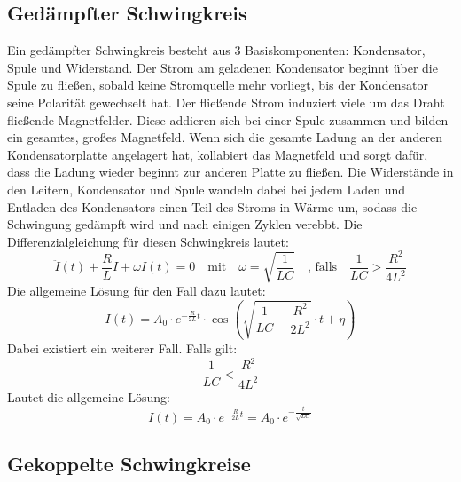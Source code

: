 \subsection{Gedämpfter Schwingkreis}
Ein gedämpfter Schwingkreis besteht aus 3 Basiskomponenten: Kondensator, Spule und Widerstand.
Der Strom am geladenen Kondensator beginnt über die Spule zu fließen, sobald keine Stromquelle mehr vorliegt, bis der Kondensator seine Polarität gewechselt hat.
Der fließende Strom induziert viele um das Draht fließende Magnetfelder. Diese addieren sich bei einer Spule zusammen und bilden ein gesamtes, großes Magnetfeld.
Wenn sich die gesamte Ladung an der anderen Kondensatorplatte angelagert hat, kollabiert das Magnetfeld und sorgt dafür, dass die Ladung wieder beginnt zur anderen Platte zu fließen.
Die Widerstände in den Leitern, Kondensator und Spule wandeln dabei bei jedem Laden und Entladen des Kondensators einen Teil des Stroms in Wärme um, sodass die Schwingung gedämpft wird und nach einigen Zyklen verebbt.
Die Differenzialgleichung für diesen Schwingkreis lautet:
\begin{equation}
    \ddot{I}(t) + \frac{R}{L}\dot{I} + \omega I(t) = 0 \quad\textrm{mit}\quad \omega = \sqrt{\frac{1}{LC}}
    \quad\textrm{, falls}\quad \frac{1}{LC} > \frac{R^2}{4L^2}
    \label{eq:harmossi}
\end{equation}
Die allgemeine Lösung für den Fall dazu lautet:
\begin{equation}
    I(t) = A_0 \cdot e^{-\frac{R}{2L}t} \cdot \cos{(\sqrt{\frac{1}{LC}-\frac{R^2}{2L^2}}\cdot t+\eta)}
\end{equation}
Dabei existiert ein weiterer Fall. Falls gilt:
\begin{equation}
    \frac{1}{LC} < \frac{R^2}{4L^2}
\end{equation}
Lautet die allgemeine Lösung:
\begin{equation}
    I(t) = A_0 \cdot e^{-\frac{R}{2L}t} = A_0 \cdot e^{-\frac{t}{\sqrt{LC}}}
    \label{eq:harmossi2}
\end{equation}


\subsection{Gekoppelte Schwingkreise}


